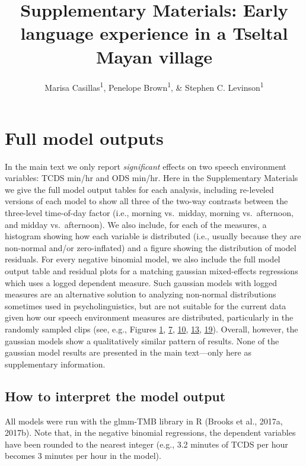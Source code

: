\documentclass[floatsintext,man]{apa6}
\title{Supplementary Materials: Early language experience in a Tseltal Mayan
village}
\author{Marisa Casillas\textsuperscript{1}, Penelope Brown\textsuperscript{1}, \& Stephen C. Levinson\textsuperscript{1}}
\affiliation{
    \vspace{0.5cm}
          \textsuperscript{1} Max Planck Institute for Psycholinguistics  }
\theoremstyle{definition}
\theoremstyle{definition}
\theoremstyle{definition}
\theoremstyle{remark}
\begin{document}
\maketitle

\setcounter{secnumdepth}{0}



\section{Full model outputs}\label{models}

In the main text we only report \emph{significant} effects on two speech
environment variables: TCDS min/hr and ODS min/hr. Here in the
Supplementary Materials we give the full model output tables for each
analysis, including re-leveled versions of each model to show all three
of the two-way contrasts between the three-level time-of-day factor
(i.e., morning vs.~midday, morning vs.~afternoon, and midday
vs.~afternoon). We also include, for each of the measures, a histogram
showing how each variable is distributed (i.e., usually because they are
non-normal and/or zero-inflated) and a figure showing the distribution
of model residuals. For every negative binomial model, we also include
the full model output table and residual plots for a matching gaussian
mixed-effects regressions which uses a logged dependent measure. Such
gaussian models with logged measures are an alternative solution to
analyzing non-normal distributions sometimes used in psycholinguistics,
but are not suitable for the current data given how our speech
environment measures are distributed, particularly in the randomly
sampled clips (see, e.g., Figures \protect\hyperlink{fig1}{1},
\protect\hyperlink{fig7}{7}, \protect\hyperlink{fig10}{10},
\protect\hyperlink{fig13}{13}, \protect\hyperlink{fig19}{19}). Overall,
however, the gaussian models show a qualitatively similar pattern of
results. None of the gaussian model results are presented in the main
text---only here as supplementary information.

\subsection{How to interpret the model
output}\label{how-to-interpret-the-model-output}

All models were run with the glmm-TMB library in R (Brooks et al.,
2017a, 2017b). Note that, in the negative binomial regressions, the
dependent variables have been rounded to the nearest integer (e.g., 3.2
minutes of TCDS per hour becomes 3 minutes per hour in the model).
\end{document}
